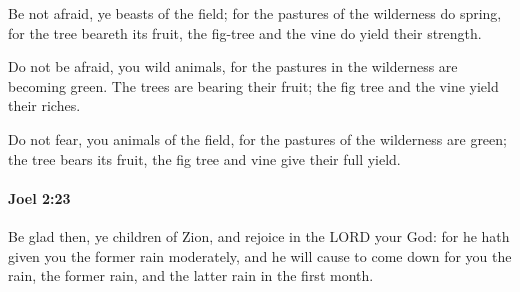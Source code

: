 			\begin{versebox}
					\item[BHS] 
					\item[LXX] 
					\item[ASV] Be not afraid, ye beasts of the field; for the pastures of the wilderness do spring, for the tree beareth its fruit, the fig-tree and the vine do yield their strength.
					\item[NIV] Do not be afraid, you wild animals, for the pastures in the wilderness are becoming green. The trees are bearing their fruit; the fig tree and the vine yield their riches.
					\item[NRSV] Do not fear, you animals of the field, for the pastures of the wilderness are green; the tree bears its fruit, the fig tree and vine give their full yield.
			\end{versebox}

		\paragraph{Joel 2:23} %
			\label{JOEL-2-23}

			Be glad then, ye children of Zion, and rejoice in the LORD your God: for he hath given you the former rain moderately, and he will cause to come down for you the rain, the former rain, and the latter rain in the first month.

